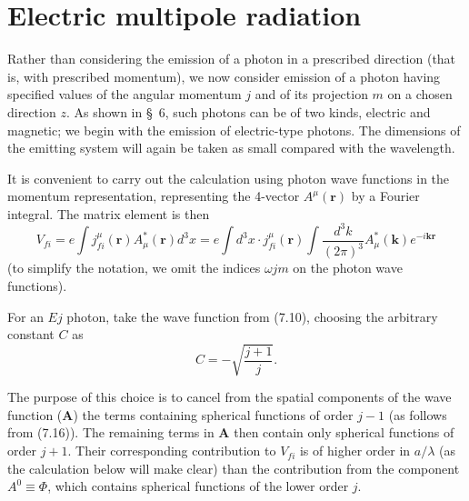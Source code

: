 \section{Electric multipole radiation}

Rather than considering the emission of a photon in a prescribed direction (that is, with prescribed momentum), we now consider emission of a photon having specified values of the angular momentum $j$ and of its projection $m$ on a chosen direction $z$. As shown in \S~6, such photons can be of two kinds, electric and magnetic; we begin with the emission of electric-type photons. The dimensions of the emitting system will again be taken as small compared with the wavelength.

It is convenient to carry out the calculation using photon wave functions in the momentum representation, representing the 4-vector $A^\mu(\mathbf r)$ by a Fourier integral. The matrix element is then
\begin{equation}
V_{fi}=e\int j_{fi}^\mu(\mathbf r)A_\mu^*(\mathbf r)d^3x
=e\int d^3x\cdot j_{fi}^\mu(\mathbf r)\int\frac{d^3k}{(2\pi)^3}A_\mu^*(\mathbf k)e^{-i\mathbf k\mathbf r}
\tag{46.1}
\end{equation}
(to simplify the notation, we omit the indices $\omega jm$ on the photon wave functions).

For an $Ej$ photon, take the wave function from (7.10), choosing the arbitrary constant $C$ as
\[
C=-\sqrt{\frac{j+1}{j}}.
\]

The purpose of this choice is to cancel from the spatial components of the wave function ($\mathbf A$) the terms containing spherical functions of order $j-1$ (as follows from (7.16)). The remaining terms in $\mathbf A$ then contain only spherical functions of order $j+1$. Their corresponding contribution to $V_{fi}$ is of higher order in $a/\lambda$ (as the calculation below will make clear) than the contribution from the component $A^0\equiv\Phi$, which contains spherical functions of the lower order $j$.

